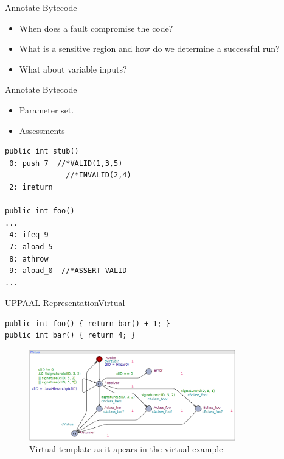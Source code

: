 

\begin{frame}{Annotate Bytecode}{}
\begin{itemize}
\item When does a fault compromise the code?
\item What is a sensitive region and how do we determine a successful run?
\item What about variable inputs? 
\end{itemize}
\end{frame}

\begin{frame}[fragile]{Annotate Bytecode}{}
\begin{minipage}{.30\textwidth}
\begin{itemize}
\item Parameter set.
\item Assessments
\end{itemize}

\end{minipage}%
\hspace{20px}
\begin{minipage}{0.60\textwidth}
\begin{lstlisting}[frame=single]
public int stub()
 0: push 7  //*VALID(1,3,5)
 	          //*INVALID(2,4)
 2: ireturn 

public int foo()
...
 4: ifeq 9
 7: aload_5 
 8: athrow
 9: aload_0  //*ASSERT VALID
...
\end{lstlisting}
\end{minipage}
\end{frame}

\begin{frame}[fragile]{UPPAAL Representation}{Virtual}


\begin{lstlisting}[frame=single]
public int foo() { return bar() + 1; }
public int bar() { return 4; }
\end{lstlisting}

\begin{figure}
\centering
\includegraphics[width=0.8\textwidth]{figures/oldvirtual.png}
\caption{\footnotesize Virtual template as it apears in the virtual example}
\end{figure}
\end{frame}

